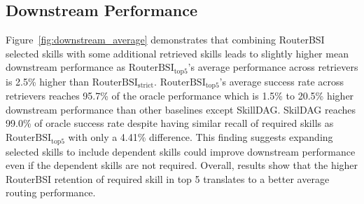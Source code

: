 \subsection{Downstream Performance}

Figure~\ref{fig:downstream_average} demonstrates that combining RouterBSI selected skills with some additional retrieved skills leads to slightly higher mean downstream performance as $\mathrm{RouterBSI}_{\mathrm{top}5}$’s average performance across retrievers is 2.5\% higher than $\mathrm{RouterBSI}_{\mathrm{strict}}$. $\mathrm{RouterBSI}_{\mathrm{top}5}$’s average success rate across retrievers reaches 95.7\% of the oracle performance which is 1.5\% to 20.5\% higher downstream performance than other baselines except SkillDAG. SkilDAG reaches 99.0\% of oracle success rate despite having similar recall of required skills as $\mathrm{RouterBSI}_{\mathrm{top}5}$ with only a 4.41\% difference. This finding suggests expanding selected skills to include dependent skills could improve downstream performance even if the dependent skills are not required. Overall, results show that the higher RouterBSI retention of required skill in top 5 translates to a better average routing performance.


